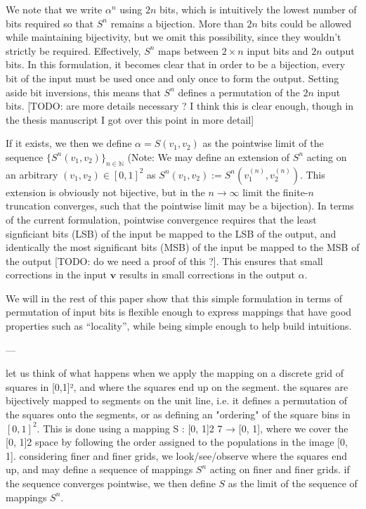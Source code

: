 \documentclass[10pt,letterpaper]{article}
\renewcommand{\vec}[1]{\boldsymbol{#1}}
\begin{document}
We note that we write $\alpha^n$ using $2n$ bits, which is intuitively the lowest number of bits required so that $S^n$ remains a bijection. More than $2n$ bits could be allowed while maintaining bijectivity, but we omit this possibility, since they wouldn't strictly be required. Effectively, $S^n$ maps between $2\times n$ input bits and $2n$ output bits. In this formulation, it becomes clear that in order to be a bijection, every bit of the input must be used once and only once to form the output. Setting aside bit inversions, this means that $S^n$ defines a permutation of the $2n$ input bits. [TODO: are more details necessary ? I think this is clear enough, though in the thesis manuscript I got over this point in more detail]

If it exists, we then we define $\alpha = S(v_1, v_2)$ as the pointwise limit of the sequence $\{S^n(v_1, v_2)\}_{n \in \mathbb N}$ (Note: We may define an extension of $S^n$ acting on an arbitrary $(v_1, v_2) \in [0,1]^2$ as $S^n(v_1, v_2) := S^n(v_1^{(n)}, v_2^{(n)})$. This extension is obviously not bijective, but in the $n \to \infty$ limit the finite-$n$ truncation converges, such that the pointwise limit may be a bijection). In terms of the current formulation, pointwise convergence requires that the least signficiant bits (LSB) of the input be mapped to the LSB of the output, and identically the most significant bits (MSB) of the input be mapped to the MSB of the output [TODO: do we need a proof of this ?]. This ensures that small corrections in the input $\vec{v}$ results in small corrections in the output $\alpha$.

We will in the rest of this paper show that this simple formulation in terms of permutation of input bits is flexible enough to express mappings that have good properties such as ``locality'', while being simple enough to help build intuitions.



---

let us think of what happens when we apply the mapping on a discrete grid of squares in [0,1]², and where the squares end up on the segment.
the squares are bijectively mapped to segments on the unit line, i.e. it defines a permutation of the squares onto the segments, or as defining an "ordering" of the square bins in $[0,1]^2$. This is done using a mapping S : [0, 1]2 7 → [0, 1],
where we cover the [0, 1]2 space by following the order assigned to the populations in
the image [0, 1].
considering finer and finer grids, we look/see/observe where the squares end up, and may define a sequence of mappings $S^n$ acting on finer and finer grids.
if the sequence converges pointwise, we then define $S$ as the limit of the sequence of mappings $S^n$.
\end{document}
